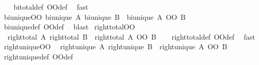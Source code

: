 \begin{isabellebody}
%
\isadelimproof
\ \ %
\endisadelimproof
%
\isatagproof
{}\isamarkupfalse%
\ bi{\isacharunderscore}{\kern0pt}total{\isacharunderscore}{\kern0pt}def\ OO{\isacharunderscore}{\kern0pt}def\ \isamarkupfalse%
\ fast%
\endisatagproof
{\isafoldproof}%
%
\isadelimproof
\isanewline
%
\endisadelimproof
\isanewline
{}\isamarkupfalse%
\ bi{\isacharunderscore}{\kern0pt}unique{\isacharunderscore}{\kern0pt}OO{\isacharcolon}{\kern0pt}\ {\isachardoublequoteopen}{\isasymlbrakk}bi{\isacharunderscore}{\kern0pt}unique\ A{\isacharsemicolon}{\kern0pt}\ bi{\isacharunderscore}{\kern0pt}unique\ B{\isasymrbrakk}\ {\isasymLongrightarrow}\ bi{\isacharunderscore}{\kern0pt}unique\ {\isacharparenleft}{\kern0pt}A\ OO\ B{\isacharparenright}{\kern0pt}{\isachardoublequoteclose}\isanewline
%
\isadelimproof
\ \ %
\endisadelimproof
%
\isatagproof
{}\isamarkupfalse%
\ bi{\isacharunderscore}{\kern0pt}unique{\isacharunderscore}{\kern0pt}def\ OO{\isacharunderscore}{\kern0pt}def\ \isamarkupfalse%
\ blast%
\endisatagproof
{\isafoldproof}%
%
\isadelimproof
\isanewline
%
\endisadelimproof
\isanewline
{}\isamarkupfalse%
\ right{\isacharunderscore}{\kern0pt}total{\isacharunderscore}{\kern0pt}OO{\isacharcolon}{\kern0pt}\isanewline
\ \ {\isachardoublequoteopen}{\isasymlbrakk}right{\isacharunderscore}{\kern0pt}total\ A{\isacharsemicolon}{\kern0pt}\ right{\isacharunderscore}{\kern0pt}total\ B{\isasymrbrakk}\ {\isasymLongrightarrow}\ right{\isacharunderscore}{\kern0pt}total\ {\isacharparenleft}{\kern0pt}A\ OO\ B{\isacharparenright}{\kern0pt}{\isachardoublequoteclose}\isanewline
%
\isadelimproof
\ \ %
\endisadelimproof
%
\isatagproof
{}\isamarkupfalse%
\ right{\isacharunderscore}{\kern0pt}total{\isacharunderscore}{\kern0pt}def\ OO{\isacharunderscore}{\kern0pt}def\ \isamarkupfalse%
\ fast%
\endisatagproof
{\isafoldproof}%
%
\isadelimproof
\isanewline
%
\endisadelimproof
\isanewline
{}\isamarkupfalse%
\ right{\isacharunderscore}{\kern0pt}unique{\isacharunderscore}{\kern0pt}OO{\isacharcolon}{\kern0pt}\isanewline
\ \ {\isachardoublequoteopen}{\isasymlbrakk}right{\isacharunderscore}{\kern0pt}unique\ A{\isacharsemicolon}{\kern0pt}\ right{\isacharunderscore}{\kern0pt}unique\ B{\isasymrbrakk}\ {\isasymLongrightarrow}\ right{\isacharunderscore}{\kern0pt}unique\ {\isacharparenleft}{\kern0pt}A\ OO\ B{\isacharparenright}{\kern0pt}{\isachardoublequoteclose}\isanewline
%
\isadelimproof
\ \ %
\endisadelimproof
%
\isatagproof
{}\isamarkupfalse%
\ right{\isacharunderscore}{\kern0pt}unique{\isacharunderscore}{\kern0pt}def\ OO{\isacharunderscore}{\kern0pt}def\ \isamarkupfalse%

\end{isabellebody}
